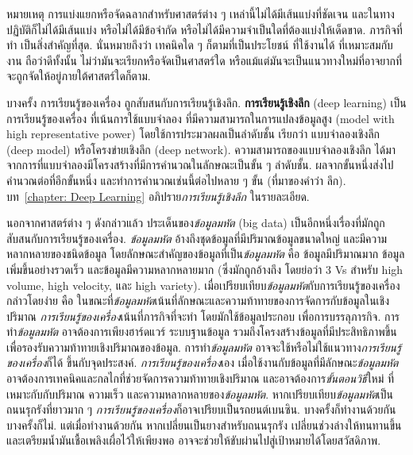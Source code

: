 หมายเหตุ การแบ่งแยกหรือจัดฉลากสำหรับศาสตร์ต่าง ๆ เหล่านี้ไม่ได้มีเส้นแบ่งที่ชัดเจน และในทางปฏิบัติก็ไม่ได้มีเส้นแบ่ง หรือไม่ได้มีข้อจำกัด หรือไม่ได้มีความจำเป็นใดที่ต้องแบ่งให้เด็ดขาด.
ภารกิจที่ทำ เป็นสิ่งสำคัญที่สุด. 
นั่นหมายถึงว่า เทคนิคใด ๆ ก็ตามที่เป็นประโยชน์ ที่ใช้งานได้ ที่เหมาะสมกับงาน ถือว่าดีทั้งนั้น ไม่ว่ามันจะเรียกหรือจัดเป็นศาสตร์ใด หรือแม้แต่มันจะเป็นแนวทางใหม่ที่อาจยากที่จะถูกจัดให้อยู่ภายใต้ศาสตร์ใดก็ตาม.


บางครั้ง การเรียนรู้ของเครื่อง
ถูกสับสนกับการเรียนรู้เชิงลึก.
\textbf{การเรียนรู้เชิงลึก} (deep learning)
เป็น
การเรียนรู้ของเครื่อง
ที่เน้นการใช้แบบจำลอง 
ที่มีความสามารถในการแปลงข้อมูลสูง (model with high representative power)
โดยใช้การประมวลผลเป็นลำดับชั้น
เรียกว่า แบบจำลองเชิงลึก (deep model) หรือโครงข่ายเชิงลึก (deep network).
ความสามารถของแบบจำลองเชิงลึก
ได้มาจากการที่แบบจำลองมีโครงสร้างที่มีการคำนวณในลักษณะเป็นขั้น ๆ ลำดับชั้น. ผลจากขั้นหนึ่งส่งไปคำนวณต่อที่อีกขั้นหนึ่ง
และทำการคำนวณเช่นนี้ต่อไปหลาย ๆ ขั้น (ที่มาของคำว่า ลึก).
บท~\ref{chapter: Deep Learning}
อภิปราย\textit{การเรียนรู้เชิงลึก} ในรายละเอียด.

นอกจากศาสตร์ต่าง ๆ ดังกล่าวแล้ว
ประเด็นของ\textit{ข้อมูลมหัต} (big data)
เป็นอีกหนึ่งเรื่องที่มักถูกสับสนกับการเรียนรู้ของเครื่อง.
\textit{ข้อมูลมหัต} อ้างถึงชุดข้อมูลที่มีปริมาณข้อมูลขนาดใหญ่ และมีความหลากหลายของชนิดข้อมูล 
โดยลักษณะสำคัญของข้อมูลที่เป็น\textit{ข้อมูลมหัต} คือ ข้อมูลมีปริมาณมาก
ข้อมูลเพิ่มขึ้นอย่างรวดเร็ว
และข้อมูลมีความหลากหลายมาก
(ซึ่งมักถูกอ้างถึง โดยย่อว่า 3 Vs สำหรับ
high volume, high velocity, และ high variety).
เมื่อเปรียบเทียบ\textit{ข้อมูลมหัต}กับการเรียนรู้ของเครื่อง
กล่าวโดยง่าย 
คือ
ในขณะที่\textit{ข้อมูลมหัต}เน้นที่ลักษณะและความท้าทายของการจัดการกับข้อมูลในเชิงปริมาณ
\textit{การเรียนรู้ของเครื่อง}เน้นที่ภารกิจที่จะทำ โดยมักใช้ข้อมูลประกอบ
เพื่อการบรรลุภารกิจ.
การทำ\textit{ข้อมูลมหัต} อาจต้องการเพียงฮาร์ดแวร์  ระบบฐานข้อมูล รวมถึงโครงสร้างข้อมูลที่มีประสิทธิภาพขึ้น เพื่อรองรับความท้าทายเชิงปริมาณของข้อมูล.
การทำ\textit{ข้อมูลมหัต} อาจจะใช้หรือไม่ใช้แนวทาง\textit{การเรียนรู้ของเครื่อง}ก็ได้ ขึ้นกับจุดประสงค์.
\textit{การเรียนรู้ของเครื่อง}เอง เมื่อใช้งานกับข้อมูลที่มีลักษณะ\textit{ข้อมูลมหัต}
อาจต้องการเทคนิคและกลไกที่ช่วยจัดการความท้าทายเชิงปริมาณ
และอาจต้องการ\textit{ขั้นตอนวิธี}ใหม่ ที่เหมาะกับกับปริมาณ ความเร็ว และความหลากหลายของ\textit{ข้อมูลมหัต}.
หากเปรียบเทียบ\textit{ข้อมูลมหัต}เป็นถนนรุกรังที่ยาวมาก ๆ
\textit{การเรียนรู้ของเครื่อง}ก็อาจเปรียบเป็นรถยนต์เบนซิน.
บางครั้งก็ทำงานด้วยกัน บางครั้งก็ไม่.
แต่เมื่อทำงานด้วยกัน หากเปลี่ยนเป็นยางสำหรับถนนรุกรัง
เปลี่ยนช่วงล่างให้ทนทานขึ้น
และเตรียมน้ำมันเชื้อเพลิงเผื่อไว้ให้เพียงพอ อาจจะช่วยให้ขับผ่านไปสู่เป้าหมายได้โดยสวัสดิภาพ.

